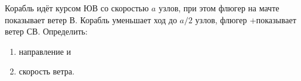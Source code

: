 Корабль идёт курсом ЮВ со скоростью $a$ узлов, при этом флюгер на
мачте показывает ветер В. Корабль уменьшает ход до $a/2$ узлов, флюгер
+показывает ветер СВ. Определить: \begin{enumerate}
\item направление и
\item скорость ветра.
\end{enumerate}
